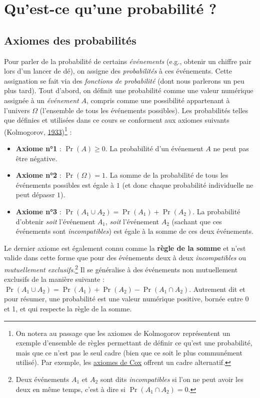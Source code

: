 \documentclass[
  a4paper,11pt,twoside,onecolumn,openright,final,oldfontcommands]{memoir}
\theoremstyle{definition}
\theoremstyle{definition}
\theoremstyle{definition}
\theoremstyle{remark}
\begin{document}
\hypertarget{quest-ce-quune-probabilituxe9}{%
\section{Qu'est-ce qu'une probabilité ?}\label{quest-ce-quune-probabilituxe9}}

\hypertarget{axiomes-des-probabilituxe9s}{%
\subsection{Axiomes des probabilités}\label{axiomes-des-probabilituxe9s}}

Pour parler de la probabilité de certains \emph{événements} (e.g., obtenir un chiffre pair lors d'un lancer de dé), on assigne des \emph{probabilités} à ces événements. Cette assignation se fait via des \emph{fonctions de probabilité} (dont nous parlerons un peu plus tard). Tout d'abord, on définit une probabilité comme une valeur numérique assignée à un \emph{événement} \(A\), compris comme une possibilité appartenant à l'univers \(\Omega\) (l'ensemble de tous les événements possibles). Les probabilités telles que définies et utilisées dans ce cours se conforment aux axiomes suivants (Kolmogorov, \protect\hyperlink{ref-kolmogorov_foundations_1933}{1933})\footnote{On notera au passage que les axiomes de Kolmogorov représentent un exemple d'ensemble de règles permettant de définir ce qu'est une probabilité, mais que ce n'est pas le seul cadre (bien que ce soit le plus communément utilisé). Par exemple, les \href{https://en.wikipedia.org/wiki/Cox\%27s_theorem}{axiomes de Cox} offrent un cadre alternatif.} :

\begin{itemize}
\item
  \textbf{Axiome n°1} : \(\Pr(A) \geq 0\). La probabilité d'un événement \(A\) ne peut pas être négative.
\item
  \textbf{Axiome n°2} : \(\Pr(\Omega) = 1\). La somme de la probabilité de tous les événements possibles est égale à \(1\) (et donc chaque probabilité individuelle ne peut dépassr \(1\)).
\item
  \textbf{Axiome n°3} : \(\Pr(A_{1} \cup A_{2}) = \Pr(A_{1}) + \Pr(A_{2})\). La probabilité d'obtenir \emph{soit} l'événement \(A_{1}\), \emph{soit} l'événement \(A_{2}\) (sachant que ces événements sont \emph{incompatibles}) est égale à la somme de ces deux événements.
\end{itemize}

Le dernier axiome est également connu comme la \textbf{règle de la somme} et n'est valide dans cette forme que pour des événements deux à deux \emph{incompatibles} ou \emph{mutuellement exclusifs}.\footnote{Deux événements \(A_{1}\) et \(A_{2}\) sont dits \emph{incompatibles} si l'on ne peut avoir les deux en même temps, c'est à dire si \(\Pr(A_{1} \cap A_{2}) = 0\).} Il se généralise à des événements non mutuellement exclusifs de la manière suivante : \(\Pr(A_{1} \cup A_{2}) = \Pr(A_{1}) + \Pr(A_{2}) - \Pr(A_{1} \cap A_{2})\). Autrement dit et pour résumer, une probabilité est une valeur numérique positive, bornée entre 0 et 1, et qui respecte la règle de la somme.
\end{document}
